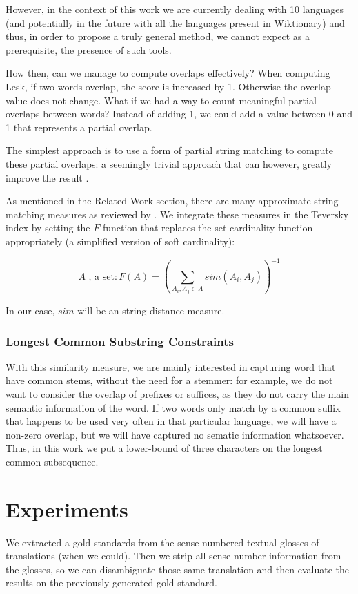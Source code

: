 \documentclass[10pt, a4paper]{article}
\begin{document}
However, in the context of this work we are currently dealing with 10 languages (and potentially in the future with all the languages present in Wiktionary) and thus, in order to propose a truly general method, we cannot expect as a prerequisite, the presence of such tools. 

How then, can we manage to compute overlaps effectively? When computing Lesk, if two words overlap, the score is increased by 1. Otherwise the overlap value does not change. What if we had a way to count meaningful partial overlaps between words? Instead of adding 1, we could add a value between 0 and 1 that represents a partial overlap.

The simplest approach is to use a form of partial string matching to compute these partial overlaps: a seemingly trivial approach that can however, greatly improve the result \cite{Jimenez2012}. 

As mentioned in the Related Work section, there are many approximate string matching measures as reviewed by \cite{Cohen2003}. We integrate these measures in the Teversky index by setting the \(F\) function that replaces the set cardinality function appropriately (a simplified version of soft cardinality):

\[
	A \mbox{ , a set} : F(A) = (\sum_{A_i,A_j \in A}sim(A_i, A_j))^{-1}
\]

In our case, \(sim\) will be an string distance measure.

\subsubsection{Longest Common Substring Constraints}
With this similarity measure, we are mainly interested in capturing word that have common stems, without the need for a stemmer: for example, we do not want to consider the overlap of prefixes or suffices, as they do not carry the main semantic information of the word. If two words only match by a common suffix that happens to be used very often in that particular language, we will have a non-zero overlap, but we will have captured no sematic information whatsoever. Thus, in this work we put a lower-bound of three characters on the longest common subsequence.

\section{Experiments}
\label{sec:expe}
We extracted a gold standards from the sense numbered textual glosses of translations (when we could). Then we strip all sense number information from the glosses, so we can disambiguate those same translation and then evaluate the results on the previously generated gold standard.
\end{document}
